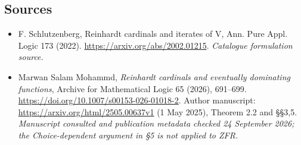 \documentclass[11pt]{article}
\begin{document}
\subsection{Sources}
\begin{itemize}\raggedright
\item[\textnormal{[S1]}]\hypertarget{source:statement:1}{} F. Schlutzenberg, Reinhardt cardinals and iterates of V, Ann. Pure Appl. Logic 173 (2022).
\url{https://arxiv.org/abs/2002.01215}.
{\small\textit{Catalogue formulation source.}}
\item[\textnormal{[E1]}]\hypertarget{extra:statement:1}{} Marwan Salam Mohammd,
\emph{Reinhardt cardinals and eventually dominating functions},
Archive for Mathematical Logic 65 (2026), 691--699.
\url{https://doi.org/10.1007/s00153-026-01018-2}.
Author manuscript: \url{https://arxiv.org/html/2505.00637v1} (1 May 2025),
Theorem 2.2 and \S\S3,5.
{\small\textit{Manuscript consulted and publication metadata checked
24 September 2026; the Choice-dependent argument in \S5 is not applied to ZFR.}}
\end{itemize}
\end{document}
